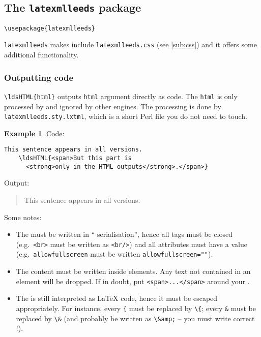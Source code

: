 \documentclass[a4paper]{article}
\def\ltxinline{\lstinline[style=latexml,frame=none]}
\theoremstyle{definition}
\newtheorem{exa}{Example}[subsection]
\begin{document}
\subsection{The \texttt{latexmlleeds} package}
\label{sub:latexmlleeds-sty}
\begin{lstlisting}[style=latexml,caption={Import \texttt{latexmlleeds} in the preamble}]
  \usepackage{latexmlleeds}
\end{lstlisting}

\verb|latexmlleeds| makes \LaTeXML{} include \verb|latexmlleeds.css| (see \autoref{sub:css}) and it offers some additional functionality.

\subsubsection{Outputting \HTML{} code}
\ltxinline|\ldsHTML{html}| outputs \ltxinline|html| argument directly as \HTML{} code. The \ltxinline|html| is only processed by \LaTeXML{} and ignored by other engines. The \LaTeXML{} processing is done by \verb|latexmlleeds.sty.lxtml|, which is a short Perl file you do not need to touch.
\begin{exa}
  Code:
  \begin{lstlisting}[style=latexml]
    This sentence appears in all versions.
    \ldsHTML{<span>But this part is
      <strong>only in the HTML outputs</strong>.</span>}
  \end{lstlisting}
  Output:
  \begin{quote}
    This sentence appears in all versions.
  \end{quote}
\end{exa}

Some notes:
\begin{itemize}
  \item The \HTML{} must be written in ``\XML{} serialisation'', hence all tags must be closed (e.g.\ \verb|<br>| must be written as \verb|<br/>|) and all attributes must have a value (e.g.\ \verb|allowfullscreen| must be written \verb|allowfullscreen=""|).
  \item The content must be written inside \HTML{} elements. Any text not contained in an element will be dropped. If in doubt, put \verb|<span>...</span>| around your \HTML{}.
  \item The \HTML{} is still interpreted as \LaTeX{} code, hence it must be escaped appropriately. For instance, every \ltxinline|{| must be replaced by \ltxinline|\{|; every \ltxinline|&| must be replaced by \ltxinline|\&| (and probably be written as \ltxinline|\&amp;| -- you must write correct \HTML{}!).
\end{itemize}
\end{document}
